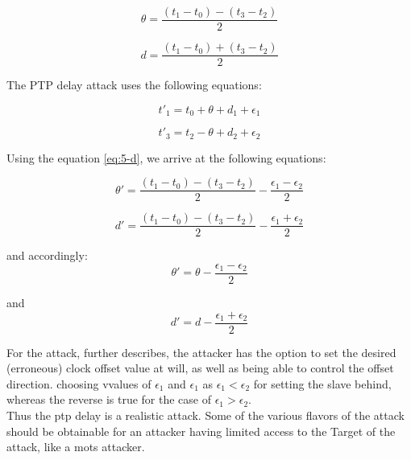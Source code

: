 \begin{equation}  \label{eq:5-offset}
\theta = \frac{(t_1 - t_0) - (t_3 - t_2)}{2}
\end{equation}


\begin{equation}  \label{eq:5-d}
d  = \frac{(t_1 - t_0) + (t_3 - t_2)}{2}
\end{equation}


The PTP delay attack uses the following equations:

\begin{equation}
    t'_1 = t_0 + \theta + d_1 + \epsilon_1
\end{equation}


\begin{equation}
    t'_3 = t_2 - \theta + d_2 + \epsilon_2
\end{equation}


Using the equation \ref{eq:5-d}, we arrive at  the following equations:



\begin{equation}  \label{eq:5-dtheta}
\theta' = \frac{(t_1 - t_0) - (t_3 - t_2)}{2} - \frac{\epsilon_1 - \epsilon_2}{2}
\end{equation}

\begin{equation}  \label{eq:5-d-delay}
d' = \frac{(t_1 - t_0) - (t_3 - t_2)}{2} - \frac{\epsilon_1 + \epsilon_2}{2}
\end{equation}

and accordingly:
\begin{equation}
    \theta' = \theta - \frac{\epsilon_1 - \epsilon_2}{2} 
\end{equation}

and \\

\begin{equation}
    d' = d - \frac{\epsilon_1 + \epsilon_2}{2} 
\end{equation}


For the attack, \citeauthor{finkenzeller2022feasible} further describes, the attacker has the option to set the desired (erroneous) clock offset value at will, as well as being able to control the offset direction. choosing vvalues of $\epsilon_1$ and  $\epsilon_1$ as $\epsilon_1 < \epsilon_2$  for setting the slave behind, whereas the reverse is true for the case of  $\epsilon_1 > \epsilon_2$. \\ 

Thus the \acrshort{ptp} delay is a realistic attack. Some of the various flavors of the attack should be obtainable for an attacker having limited access to the Target of the attack, like a \acrfull{mots} attacker.